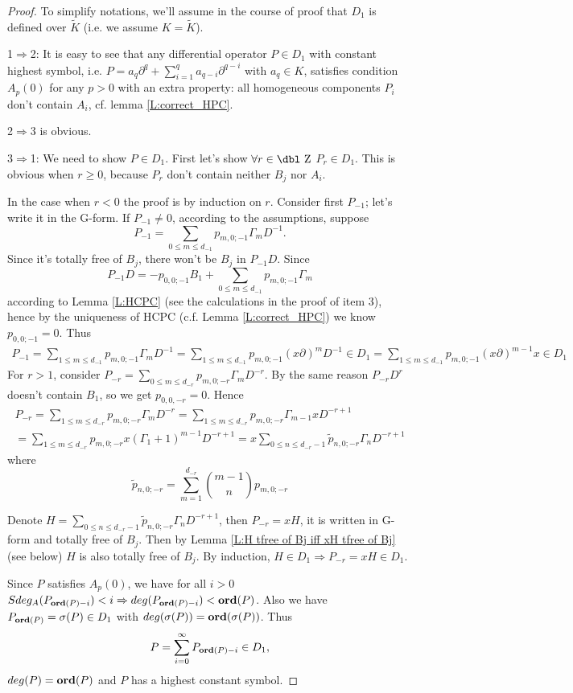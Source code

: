 \documentclass[11pt]{article}
\theoremstyle{definition}
\newcommand{\dz}{{\mbox{\dbl Z}}}
\newcommand{\Ord}{\mathop {\rm \bf ord}}
\theoremstyle{plain}
\numberwithin{equation}{section}
\begin{document}
\begin{proof}
To simplify notations, we'll assume in the course of proof that $D_1$ is defined over $\tilde{K}$ (i.e. we assume $K=\tilde{K}$). 

	1$\Rightarrow$2: It is easy to see that any differential operator $P\in D_1$ with constant highest symbol, i.e. $P=a_q\partial^q+\sum_{i=1}^q a_{q-i}\partial^{q-i}$ with $a_q\in K$, satisfies condition $A_p(0)$ for any $p>0$ with an extra property: all homogeneous components $P_i$ don't contain  $A_i$, cf. lemma \ref{L:correct_HPC}. 
	
		
	2$\Rightarrow$3 is obvious.
	
	3$\Rightarrow$1: We need to show $P\in D_1$. First let's show $\forall r\in\dz$  $P_r\in D_1$.  This is obvious  when  $r\ge 0$, because $P_r$ don't contain neither $B_j$ nor $A_i$. 
	
	In the case when $r<0$ the proof is by induction on $r$. Consider first $P_{-1}$; let's write it in the G-form. If $P_{-1}\neq 0$, according to the assumptions, suppose 
	$$
	P_{-1}=\sum_{0\leq m\leq d_{-1}}p_{m,0;-1}\Gamma_{m}D^{-1}.
	$$
	Since it's totally free of $B_j$, there won't be $B_j$ in $P_{-1} D$. Since
	$$
	P_{-1} D=-p_{0,0;-1}B_1+\sum_{0\leq m\leq d_{-1}}p_{m,0;-1}\Gamma_{m}
	$$
	according to Lemma \ref{L:HCPC} (see the calculations in the proof of item 3), hence by the uniqueness of HCPC (c.f. Lemma \ref{L:correct_HPC}) we know  $p_{0,0;-1}=0$. Thus 
	\begin{multline*}
	P_{-1}=\sum_{1\leq m\leq d_{-1}}p_{m,0;-1}\Gamma_{m}D^{-1}
	=\sum_{1\leq m\leq d_{-1}}p_{m,0;-1}(x\partial)^mD^{-1}\in D_1=\sum_{1\leq m\leq d_{-1}}p_{m,0;-1}(x\partial)^{m-1}x\in D_1
    \end{multline*}
	For $r>1$, consider $P_{-r}=\sum_{0\leq m\leq d_{-r}}p_{m,0;-r}\Gamma_mD^{-r}$. By the same reason $P_{-r}D^r$ doesn't contain $B_1$, so we get $p_{0,0,-r}=0$. Hence 
	\begin{multline*}
	P_{-r}=\sum_{1\leq m\leq d_{-r}}p_{m,0;-r}\Gamma_{m}D^{-r}=\sum_{1\leq m\leq d_{-r}}p_{m,0;-r} \Gamma_{m-1}xD^{-r+1}
	\\=\sum_{1\leq m\leq d_{-r}}p_{m,0;-r} x(\Gamma_1+1)^{m-1}D^{-r+1}=x\sum_{0\leq n\leq d_{-r}-1}\tilde{p}_{n,0;-r} \Gamma_n D^{-r+1}
    \end{multline*}
	where 
	$$
	\tilde{p}_{n,0;-r}=\sum_{m=1}^{d_{-r}}\binom{m-1}{n}p_{m,0;-r}
	$$
	
	Denote $H=\sum_{0\leq n\leq d_{-r}-1}\tilde{p}_{n,0;-r}\Gamma_{n}D^{-r+1}$, then $P_{-r}=xH$, it is written in G-form and totally free of $B_j$. Then by Lemma \ref{L:H tfree of Bj iff xH tfree of Bj} (see below) $H$ is also totally free of $B_j$. By induction, $H\in D_1\Rightarrow P_{-r}=xH\in D_1$. 
	
	Since $P$ satisfies $A_p(0)$, we have for all $i>0$ $Sdeg_A(P_{\Ord(P)-i})<i\Rightarrow deg(P_{\Ord(P)-i})<\Ord(P)$. 	Also we have $ P_{\Ord(P)}=\sigma(P)\in D_1$ with $deg(\sigma(P))=\Ord(\sigma(P))$. Thus 
$$P=\sum_{i=0}^{\infty} P_{\Ord(P)-i}\in D_1,$$ 
	$deg(P)=\Ord(P)$ and $P$ has a highest constant symbol.
\end{proof}
\end{document}
